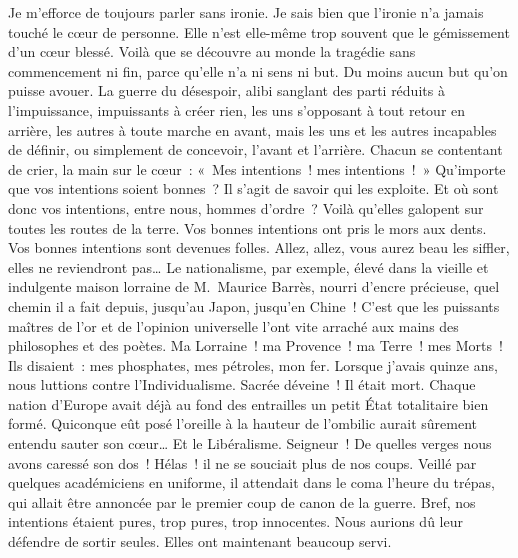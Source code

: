 \documentclass[french,twoside]{book} %
\newcommand{\astertri}{\medskip\par\centerline{\color{rubric}\large\selectfont{\syms ✻\,✻\,✻}}\medskip\par}%
\begin{document}
\astertri

\noindent Je m’efforce de toujours parler sans ironie. Je sais bien que l’ironie n’a jamais touché le cœur de personne. Elle n’est elle-même trop souvent que le gémissement d’un cœur blessé. Voilà que se découvre au monde la tragédie sans commencement ni fin, parce qu’elle n’a ni sens ni but. Du moins aucun but qu’on puisse avouer. La guerre du désespoir, alibi sanglant des parti réduits à l’impuissance, impuissants à créer rien, les uns s’opposant à tout retour en arrière, les autres à toute marche en avant, mais les uns et les autres incapables de définir, ou simplement de concevoir, l’avant et l’arrière. Chacun se contentant de crier, la main sur le cœur : « Mes intentions ! mes intentions ! » Qu’importe que vos intentions soient bonnes ? Il s’agit de savoir qui les exploite. Et où sont donc vos intentions, entre nous, hommes d’ordre ? Voilà qu’elles galopent sur toutes les routes de la terre. Vos bonnes intentions ont pris le mors aux dents. Vos bonnes intentions sont devenues folles. Allez, allez, vous aurez beau les siffler, elles ne reviendront pas… Le nationalisme, par exemple, élevé dans la vieille et indulgente maison lorraine de M. Maurice Barrès, nourri d’encre précieuse, quel chemin il a fait depuis, jusqu’au Japon, jusqu’en Chine ! C’est que les puissants maîtres de l’or et de l’opinion universelle l’ont vite arraché aux mains des philosophes et des poètes. Ma Lorraine ! ma Provence ! ma Terre ! mes Morts ! Ils disaient : mes phosphates, mes pétroles, mon fer. Lorsque j’avais quinze ans, nous luttions contre l’Individualisme. Sacrée déveine ! Il était mort. Chaque nation d’Europe avait déjà au fond des entrailles un petit État totalitaire bien formé. Quiconque eût posé l’oreille à la hauteur de l’ombilic aurait sûrement entendu sauter son cœur… Et le Libéralisme. Seigneur ! De quelles verges nous avons caressé son dos ! Hélas ! il ne se souciait plus de nos coups. Veillé par quelques académiciens en uniforme, il attendait dans le coma l’heure du trépas, qui allait être annoncée par le premier coup de canon de la guerre. Bref, nos intentions étaient pures, trop pures, trop innocentes. Nous aurions dû leur défendre de sortir seules. Elles ont maintenant beaucoup servi.\par
\end{document}
